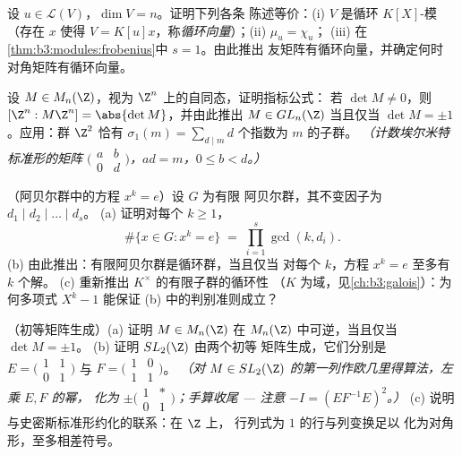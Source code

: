 \begin{exercise}[$\star\star\star$]\label{exo:b3:modules:9}
设 $u \in \mathcal L(V)$，$\dim V = n$。证明下列各条
陈述等价：(i) $V$ 是循环 $K[X]$-模（存在 $x$
使得 $V = K[u]x$，称\emph{循环向量}）；(ii) $\mu_u = \chi_u$；
(iii) 在\cref{thm:b3:modules:frobenius}中 $s = 1$。由此推出
友矩阵有循环向量，并确定何时
对角矩阵有循环向量。
\end{exercise}

\begin{exercise}[$\star\star\star$]\label{exo:b3:modules:10}
设 $M \in M_n(\Z)$，视为 $\Z^n$ 上的自同态，证明指标公式：
若 $\det M \ne 0$，则
$[\Z^n : M\Z^n] = \abs{\det M}$，并由此推出 $M \in GL_n(\Z)$
当且仅当 $\det M = \pm 1$。应用：群 $\Z^2$ 恰有
$\sigma_1(m) = \sum_{d \mid m} d$ 个指数为 $m$ 的子群。
\emph{（计数埃尔米特标准形的矩阵 $\bigl(\begin{smallmatrix}
a & b\\ 0 & d\end{smallmatrix}\bigr)$，$ad = m$，$0 \leq b <
d$。）}
\end{exercise}

\begin{exercise}[$\star\star$]\label{exo:b3:modules:11}
（阿贝尔群中的方程 $x^k = e$）设 $G$ 为有限
阿贝尔群，其不变因子为 $d_1 \mid d_2 \mid \dots
\mid d_s$。
(a) 证明对每个 $k \geq 1$，
\[
\#\{x \in G : x^k = e\} \;=\; \prod_{i=1}^{s}\gcd(k, d_i) .
\]
(b) 由此推出：有限阿贝尔群是循环群，当且仅当
对每个 $k$，方程 $x^k = e$ 至多有 $k$
个解。
(c) 重新推出 $K^\times$ 的有限子群的循环性
（$K$ 为域，见\cref{ch:b3:galois}）：为何多项式
$X^k - 1$ 能保证 (b) 中的判别准则成立？
\end{exercise}

\begin{exercise}[$\star\star\star$]\label{exo:b3:modules:12}
（初等矩阵生成）(a) 证明 $M \in M_n(\Z)$
在 $M_n(\Z)$ 中可逆，当且仅当 $\det M = \pm1$。
(b) 证明 $SL_2(\Z)$ 由两个初等
矩阵生成，它们分别是
$E = \bigl(\begin{smallmatrix}1 & 1\\ 0 &
1\end{smallmatrix}\bigr)$ 与
$F = \bigl(\begin{smallmatrix}1 & 0\\ 1 &
1\end{smallmatrix}\bigr)$。
\emph{（对 $M
\in SL_2(\Z)$ 的第一列作欧几里得算法，左乘 $E, F$ 的幂，
化为 $\pm\bigl(\begin{smallmatrix}1 & *\\ 0 &
1\end{smallmatrix}\bigr)$；手算收尾 --- 注意
$-I = (EF^{-1}E)^2$。）}
(c) 说明与史密斯标准形约化的联系：在 $\Z$ 上，
行列式为 $1$ 的行与列变换足以
化为对角形，至多相差符号。
\end{exercise}


